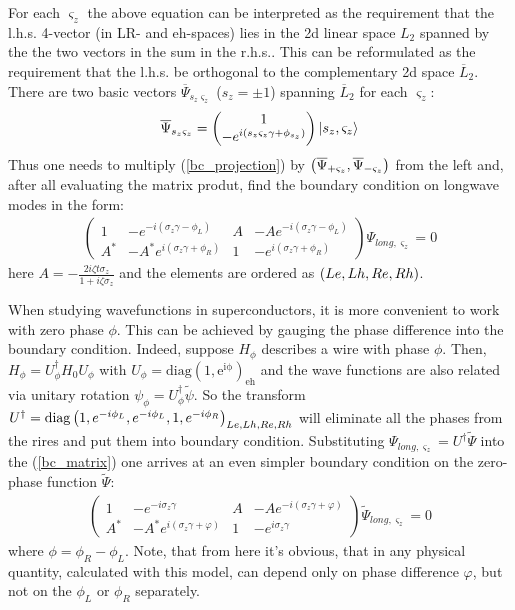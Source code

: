 For each $ \varsigma_z $ the above equation can be interpreted as the requirement that the l.h.s. 4-vector (in LR- and eh-spaces) lies in the 2d linear space $ L_{2} $ spanned by the the two vectors in the sum in the r.h.s.. This can be reformulated as the requirement that the l.h.s. be orthogonal to the complementary 2d space $ \overline{L}_{2} $. There are two basic vectors $ \overline{\Psi}_{s_z\varsigma_{z}} $ ($ s_z=\pm1 $) spanning $ \overline{L}_{2} $ for each $ \varsigma_z $:
\begin{gather}
	\overline{\Psi}_{s_z\varsigma_{z}}
	=
	\begin{pmatrix}
	1 \\
	-e^{
		i\left(
			s_z\varsigma_z\gamma
			+
			\phi_{s_z}
			\right)
		}
	\end{pmatrix}
	\ket{s_z,\varsigma_z}
\end{gather}
Thus one needs to multiply (\ref{bc_projection}) by $ \left(\overline{\Psi}_{+\varsigma_{z}},\overline{\Psi}_{-\varsigma_{z}}\right) $ from the left and, after all evaluating the matrix produt, find the boundary condition on longwave modes in the form:
\begin{gather}
\label{bc_matrix}
\begin{pmatrix}1 & -e^{-i\left(\sigma_{z}\gamma-\phi_L\right)} & A & -Ae^{-i\left(\sigma_{z}\gamma-\phi_L\right)}\\
A^{*} & -A^{*}e^{i\left(\sigma_{z}\gamma+\phi_R\right)} & 1 & -e^{i\left(\sigma_{z}\gamma+\phi_R\right)}
\end{pmatrix}\Psi_{long, \varsigma_{z}}=0
\end{gather}
here $ A=-\frac{2i\zeta t\sigma_z}{1+i\zeta\sigma_z} $ and the elements are ordered as $ \left(Le,Lh,Re,Rh\right) $.

When studying wavefunctions in superconductors, it is more convenient to work with zero phase $ \phi $. This can be achieved by gauging the phase difference into the boundary condition. Indeed, suppose $ H_{\phi} $ describes a wire with phase $ \phi $. Then, $ H_{\phi}=U_{\phi}^{\dagger}H_{0}U_{\phi} $ with $ U_{\phi}=\mathrm{diag(1,e^{i\phi})_{eh}} $ and the wave functions are also related via unitary rotation $ \psi_{\phi}=U_{\phi}^{\dagger}\tilde{\psi} $. So the transform $ U^{\dagger}=\mathrm{diag}\left(1,e^{-i\phi_L},e^{-i\phi_L},1,e^{-i\phi_R }\right)_{Le,Lh,Re,Rh}$  will eliminate all the phases from the rires and put them into boundary condition. Substituting $ \Psi_{long,\varsigma_{z}}=U^{\dagger}\tilde{\Psi} $ into the (\ref{bc_matrix}) one arrives at an even simpler boundary condition on the zero-phase function $ \tilde{\Psi} $:
\begin{gather}
\label{bc_matrix_phases}
\begin{pmatrix}1 & -e^{-i\sigma_{z}\gamma} & A & -Ae^{-i\left(\sigma_{z}\gamma+\varphi\right)}\\
A^{*} & -A^{*}e^{i\left(\sigma_{z}\gamma+\varphi\right)} & 1 & -e^{i\sigma_{z}\gamma}
\end{pmatrix}
\tilde{\Psi}_{long, \varsigma_{z}}=0
\end{gather}
where $ \phi=\phi_R-\phi_L $. Note, that from here it's obvious, that in any physical quantity, calculated with this model, can depend only on phase difference $ \varphi $,  but not on the $ \phi_L $ or $ \phi_R $ separately.

